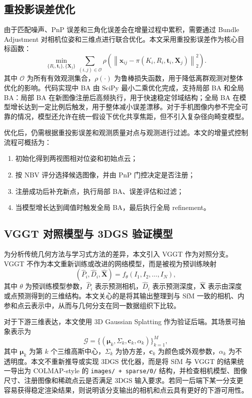 \documentclass[lang=cn,a4paper,newtx]{elegantpaper} %
\begin{document}
\subsection{重投影误差优化}
由于匹配噪声、PnP 误差和三角化误差会在增量过程中累积，需要通过 Bundle Adjustment 对相机位姿和三维点进行联合优化。本文采用重投影误差作为核心目标函数：
\begin{equation}
    \min_{\{R_i,\mathbf{t}_i\},\{\mathbf{X}_j\}}
    \sum_{(i,j)\in\mathcal{O}}
    \rho\left(
    \left\|
    \mathbf{x}_{ij}
    -\pi(K_i,R_i,\mathbf{t}_i,\mathbf{X}_j)
    \right\|_2^2
    \right).
\end{equation}
其中 $\mathcal{O}$ 为所有有效观测集合，$\rho(\cdot)$ 为鲁棒损失函数，用于降低离群观测对整体优化的影响。代码实现中 BA 由 SciPy 最小二乘优化完成，支持局部 BA 和全局 BA：局部 BA 在新图像注册后高频执行，用于快速稳定邻域结构；全局 BA 在模型增长达到一定比例后触发，用于整体减小误差漂移。对于手机图像内参不完全可靠的情况，模型还允许在统一假设下优化共享焦距，但不引入复杂径向畸变模型。

优化后，仍需根据重投影误差和观测质量对点与观测进行过滤。本文的增量式控制流程可概括为：
\begin{enumerate}
    \item 初始化得到两视图相对位姿和初始点云；
    \item 按 NBV 评分选择候选图像，并由 PnP 门控决定是否注册；
    \item 注册成功后补充新点，执行局部 BA、误差评估和过滤；
    \item 当模型增长达到阈值时触发全局 BA，最后执行全局 refinement。
\end{enumerate}

\subsection{VGGT 对照模型与 3DGS 验证模型}
为分析传统几何方法与学习式方法的差异，本文引入 VGGT 作为对照分支。VGGT 不作为本文重新训练或改进的网络模型，而是被视为预训练映射
\begin{equation}
    (\hat{P}_i,\hat{D}_i,\hat{\mathbf{X}})
    =f_{\theta}(I_1,I_2,\ldots,I_N),
\end{equation}
其中 $\theta$ 为预训练模型参数，$\hat{P}_i$ 表示预测相机，$\hat{D}_i$ 表示预测深度，$\hat{\mathbf{X}}$ 表示由深度或点预测得到的三维结构。本文关心的是将其输出整理到与 SfM 一致的相机、内参和点云表示中，从而与几何分支在同一数据组织下比较。

对于下游三维表达，本文使用 3D Gaussian Splatting 作为验证后端。其场景可抽象表示为
\begin{equation}
    \mathcal{G}
    =
    \{(\boldsymbol{\mu}_k,\Sigma_k,\mathbf{c}_k,\alpha_k)\}_{k=1}^{M},
\end{equation}
其中 $\boldsymbol{\mu}_k$ 为第 $k$ 个三维高斯中心，$\Sigma_k$ 为协方差，$\mathbf{c}_k$ 为颜色或外观参数，$\alpha_k$ 为不透明度。本文不重新推导或实现 3DGS 优化器，而是将 SfM 与 VGGT 的结果统一导出为 COLMAP-style 的 \texttt{images/ + sparse/0/} 结构，并检查相机模型、图像尺寸、注册图像和稀疏点云是否满足 3DGS 输入要求。若同一后端下某一分支更容易获得稳定渲染结果，则说明该分支输出的相机和点云具有更好的下游可用性。
\end{document}
